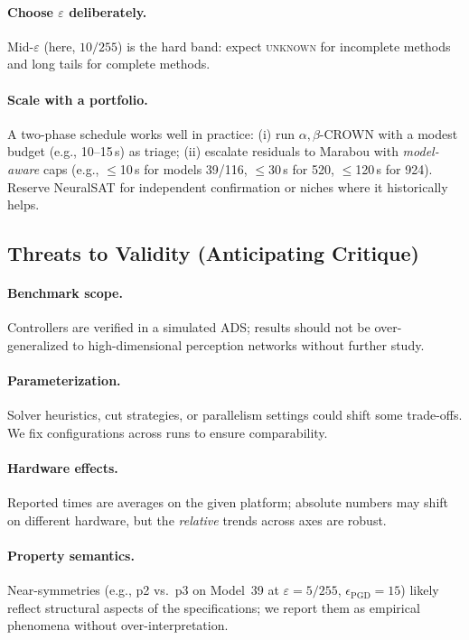 \paragraph{Choose $\varepsilon$ deliberately.}
Mid-$\varepsilon$ (here, $10/255$) is the hard band: expect \textsc{unknown} for incomplete methods and long tails for complete methods.

\paragraph{Scale with a portfolio.}
A two-phase schedule works well in practice: (i) run $\alpha,\beta$-CROWN with a modest budget (e.g., 10--15\,s) as triage; (ii) escalate residuals to Marabou with \emph{model-aware} caps (e.g., $\le$10\,s for models 39/116, $\le$30\,s for 520, $\le$120\,s for 924). Reserve NeuralSAT for independent confirmation or niches where it historically helps.

\subsection{Threats to Validity (Anticipating Critique)}
\paragraph{Benchmark scope.}
Controllers are verified in a simulated ADS; results should not be over-generalized to high-dimensional perception networks without further study.

\paragraph{Parameterization.}
Solver heuristics, cut strategies, or parallelism settings could shift some trade-offs. We fix configurations across runs to ensure comparability.

\paragraph{Hardware effects.}
Reported times are averages on the given platform; absolute numbers may shift on different hardware, but the \emph{relative} trends across axes are robust.

\paragraph{Property semantics.}
Near-symmetries (e.g., p2 vs.\ p3 on Model~39 at $\varepsilon{=}5/255$, $\epsilon_{\mathrm{PGD}}{=}15$) likely reflect structural aspects of the specifications; we report them as empirical phenomena without over-interpretation.

